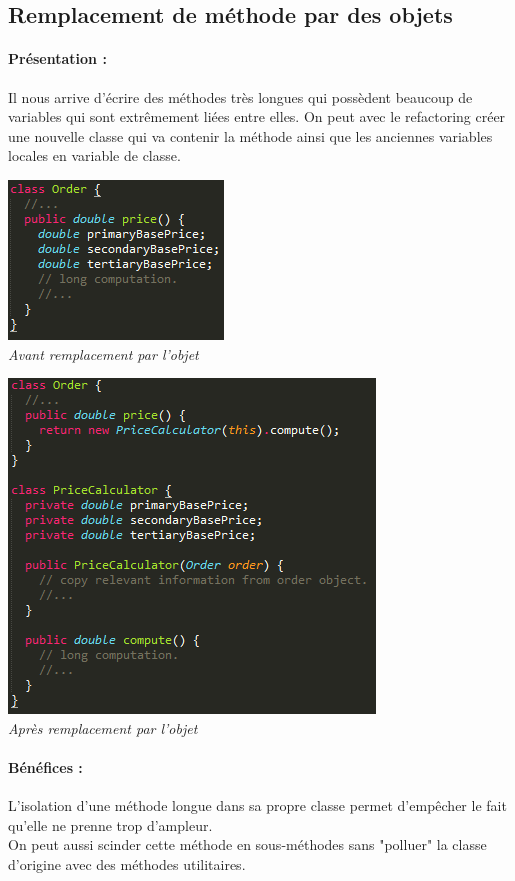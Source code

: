 \documentclass[a4paper,twoside,12pt,openright]{report}
\begin{document}
\subsection{Remplacement de méthode par des objets}
\paragraph{Présentation :}
Il nous arrive d'écrire des méthodes très longues qui possèdent beaucoup de variables qui sont extrêmement liées entre elles. On peut avec le refactoring créer une nouvelle classe qui va contenir la méthode ainsi que les anciennes variables locales en variable de classe.

\begin{center}
\includegraphics[scale=1]{Image/MethodeToObjet.png}\\
\itshape{Avant remplacement par l'objet \cite{ref5}}
\end{center}

\begin{center}
\includegraphics[scale=1]{Image/MethodeToObjet2.png}\\
\itshape{Après remplacement par l'objet \cite{ref5}}
\end{center}

\paragraph{Bénéfices :}
L'isolation d'une méthode longue dans sa propre classe permet d'empêcher le fait qu'elle ne prenne trop d'ampleur.\\
On peut aussi scinder cette méthode en sous-méthodes sans "polluer" la classe d'origine avec des méthodes utilitaires.
\end{document}
